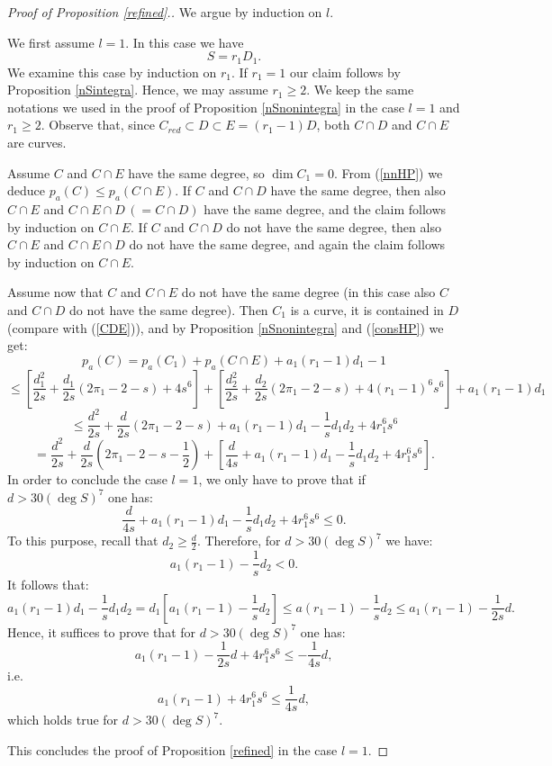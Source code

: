 \documentclass[9pt,a4paper]{amsart}
\theoremstyle{plain}
\theoremstyle{definition}
\theoremstyle{remark}
\begin{document}
\smallskip
\begin{proof}[Proof of Proposition \ref{refined}.]
We argue by induction on $l$.

We first assume $l=1$. In this case we have
$$S=r_1D_1.$$
We examine this case by induction on $r_1$. If $r_1=1$ our claim
follows by Proposition \ref{nSintegra}. Hence, we may assume
$r_1\geq 2$. We keep the same notations we used in the proof of
Proposition \ref{nSnonintegra} in the case $l=1$ and $r_1\geq 2$.
Observe that, since $C_{red}\subset D\subset E=(r_1-1)D$, both $C\cap
D$ and $C\cap E$ are curves.

\smallskip
Assume $C$ and $C\cap E$ have the same degree, so $\dim C_1=0$. From
(\ref{nnHP}) we deduce $p_a(C)\leq p_a(C\cap E)$. If $C$ and $C\cap
D$ have the same degree, then also $C\cap E$ and $C\cap E\cap D
\,(=C\cap D)$ have the same degree, and the claim follows by
induction on $C\cap E$. If $C$ and $C\cap D$ do not have the same
degree, then also $C\cap E$ and $C\cap E\cap D$ do not have the same
degree, and again the claim follows by induction on $C\cap E$.

\smallskip
Assume now that $C$ and $C\cap E$ do not have the same degree (in
this case also $C$ and $C\cap D$ do not have the same degree). Then
$C_1$ is a curve, it is contained in $D$ (compare with (\ref{CDE})),
and by Proposition \ref{nSnonintegra} and (\ref{consHP}) we get:
$$
p_a(C)=p_a(C_1)+p_a(C\cap E)+a_1(r_1-1)d_1-1
$$
$$
\leq \left[\frac{d_1^2}{2s}+\frac{d_1}{2s}(2\pi_1-2-s)+4s^6\right]+
\left[\frac{d_2^2}{2s}+\frac{d_2}{2s}(2\pi_1-2-s)+4(r_1-1)^6s^6\right]+a_1(r_1-1)d_1
$$
$$
\leq
\frac{d^2}{2s}+\frac{d}{2s}(2\pi_1-2-s)+a_1(r_1-1)d_1-\frac{1}{s}d_1d_2+4r_1^6s^6
$$
$$
=\frac{d^2}{2s}+\frac{d}{2s}\left(2\pi_1-2-s-\frac{1}{2}\right)+\left[\frac{d}{4s}+a_1(r_1-1)d_1-\frac{1}{s}d_1d_2+4r_1^6s^6\right].
$$
In order to conclude the case $l=1$, we only have to prove that if
$d>30(\deg S)^7$ one has:
$$
\frac{d}{4s}+a_1(r_1-1)d_1-\frac{1}{s}d_1d_2+4r_1^6s^6\leq 0.
$$
To this purpose, recall that $d_2\geq \frac{d}{2}$. Therefore, for
$d>30(\deg S)^7$ we have:
$$
a_1(r_1-1)-\frac{1}{s}d_2<0.
$$
It follows that:
$$
a_1(r_1-1)d_1-\frac{1}{s}d_1d_2=d_1\left[a_1(r_1-1)-\frac{1}{s}d_2\right]\leq
a(r_1-1)-\frac{1}{s}d_2\leq a_1(r_1-1)-\frac{1}{2s}d.
$$
Hence, it suffices to prove that for $d>30(\deg S)^7$ one has:
$$
a_1(r_1-1)-\frac{1}{2s}d+4r_1^6s^6\leq -\frac{1}{4s}d,
$$
i.e.
$$
a_1(r_1-1)+4r_1^6s^6\leq \frac{1}{4s}d,
$$
which holds true for $d>30(\deg S)^7$.

\smallskip
This concludes the proof of Proposition \ref{refined} in the case
$l=1$.


\end{proof}
\end{document}
